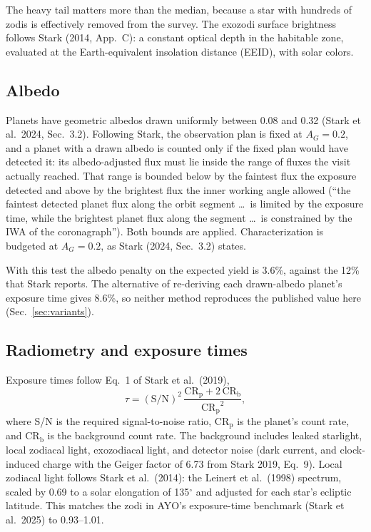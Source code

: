 \documentclass[11pt,a4paper]{article}
\begin{document}
The heavy tail matters more than the median, because a star with hundreds of zodis is effectively
removed from the survey. The exozodi surface brightness follows Stark (2014, App.~C): a constant
optical depth in the habitable zone, evaluated at the Earth-equivalent insolation distance (EEID),
with solar colors.

\subsection{Albedo}
\label{sec:albedo}

Planets have geometric albedos drawn uniformly between 0.08 and 0.32 (Stark et al.\ 2024,
Sec.~3.2). Following Stark, the observation plan is fixed at $A_G = 0.2$, and a planet with a
drawn albedo is counted only if the fixed plan would have detected it: its albedo-adjusted flux
must lie inside the range of fluxes the visit actually reached. That range is bounded below by
the faintest flux the exposure detected and above by the brightest flux the inner working angle
allowed (``the faintest detected planet flux along the orbit segment \ldots\ is limited by the
exposure time, while the brightest planet flux along the segment \ldots\ is constrained by the IWA
of the coronagraph''). Both bounds are applied. Characterization is budgeted at $A_G = 0.2$, as
Stark (2024, Sec.~3.2) states.

With this test the albedo penalty on the expected yield is 3.6\%, against the 12\% that
Stark reports. The alternative of re-deriving each drawn-albedo planet's exposure time gives
8.6\%, so neither method reproduces the published value here
(Sec.~\ref{sec:variants}).

\subsection{Radiometry and exposure times}
\label{sec:radiometry}

Exposure times follow Eq.~1 of Stark et al.\ (2019),
\begin{equation}
\tau = (\mathrm{S/N})^2\,\frac{\mathrm{CR_p} + 2\,\mathrm{CR_b}}{\mathrm{CR_p}^2},
\end{equation}
where S/N is the required signal-to-noise ratio, $\mathrm{CR_p}$ is the planet's count rate, and
$\mathrm{CR_b}$ is the background count rate. The background includes leaked starlight, local
zodiacal light, exozodiacal light, and detector noise (dark current, and clock-induced charge with
the Geiger factor of 6.73 from Stark 2019, Eq.~9). Local zodiacal light follows Stark et al.\
(2014): the Leinert et al.\ (1998) spectrum, scaled by 0.69 to a solar elongation of 135$^\circ$
and adjusted for each star's ecliptic latitude. This matches the zodi in AYO's exposure-time
benchmark (Stark et al.\ 2025) to 0.93--1.01.
\end{document}
